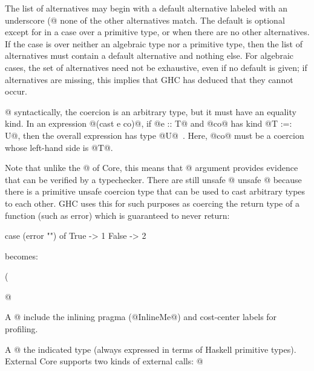 \documentclass[10pt]{article}
\begin{document}
The list of alternatives may begin with a 
default alternative labeled with an underscore (@%
none of the other alternatives match.  The default is optional except for in a case
over a primitive type, or when there are no other alternatives.
If the case is over neither an
algebraic type nor a primitive type, then the list of alternatives must contain a default alternative and nothing else.
For algebraic cases, the set of alternatives
need not be exhaustive, even if no default is given; if alternatives are missing,
this implies that GHC has deduced that they cannot occur. 

@%
syntactically, the coercion is an arbitrary type, but it must have an
equality kind. In an expression @(cast e co)@, if @e :: T@ and @co@
has kind @T :=: U@, then the overall expression has type
@U@~\citep{ghc-fc-commentary}. Here, @co@ must be a coercion whose left-hand side is @T@.

Note
that unlike the @%
of Core, this means that @%
argument provides evidence that can be verified by a
typechecker. There are still unsafe @%
unsafe @%
because there is a primitive unsafe coercion type that
can be used to cast arbitrary types to each other. GHC uses this for
such purposes as coercing the return type of a function (such as
error) which is guaranteed to never return:
\begin{code}
case (error "") of
  True -> 1
  False ->  2
\end{code}
becomes:
\begin{code}
    (%
\end{code}
@%


 
A @%
include the inlining pragma (@InlineMe@) and cost-center labels for profiling.

A @%
the indicated type (always expressed in terms of Haskell primitive types). External Core supports two kinds of external calls: @%
\end{document}
